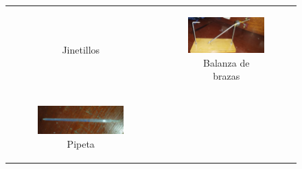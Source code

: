 \documentclass[../main.tex]{subfiles}
\begin{document}
\begin{figure}[H]
\begin{tabular}{c c}
\begin{subfigure}{0.5\textwidth}
            \caption{Jinetillos}
            \label{fig:mat3}
        \end{subfigure}
        &
        \begin{subfigure}{0.5\textwidth} 
            \centering
            \includegraphics[width=0.8\linewidth,height=0.6\linewidth]{resources/mat4.jpg}
            \caption{Balanza de brazas}
            \label{fig:mat4}
        \end{subfigure}
        \\       
        \begin{subfigure}{0.5\textwidth} 
            \centering
            \includegraphics[width=0.8\linewidth,height=0.6\linewidth]{resources/mat5.jpg}
            \caption{Pipeta}
            \label{fig:mat5}
        \end{subfigure}
        &
        \begin{subfigure}{0.5\textwidth} 
            \centering

\end{subfigure}
\end{tabular}
\end{figure}
\end{document}
